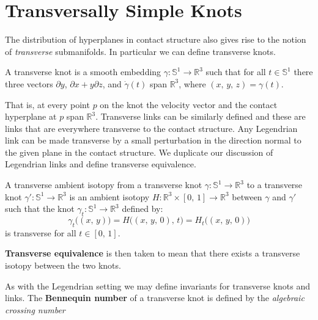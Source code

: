 \section{Transversally Simple Knots}
    The distribution of hyperplanes in contact structure also gives rise to
    the notion of \textit{transverse} submanifolds. In particular we can define
    transverse knots.
    \begin{definition}
        A transverse knot is a smooth embedding
        $\gamma:\mathbb{S}^{1}\rightarrow\mathbb{R}^{3}$ such that for all
        $t\in\mathbb{S}^{1}$ there three vectors
        $\partial{y}$, $\partial{x}+y\partial{z}$, and
        $\dot{\gamma}(t)$ span $\mathbb{R}^{3}$, where $(x,\,y,\,z)=\gamma(t)$.
    \end{definition}
    That is, at every point $p$ on the knot the velocity vector and the contact
    hyperplane at $p$ span $\mathbb{R}^{3}$. Transverse links can be similarly
    defined and these are links that are everywhere transverse to the contact
    structure. Any Legendrian link can be made transverse by a small
    perturbation in the direction normal to the given plane in the contact
    structure. We duplicate our discussion of Legendrian links and define
    transverse equivalence.
    \begin{definition}
        A transverse ambient isotopy from a transverse knot
        $\gamma:\mathbb{S}^{1}\rightarrow\mathbb{R}^{3}$ to a transverse knot
        $\gamma':\mathbb{S}^{1}\rightarrow\mathbb{R}^{3}$ is an ambient
        isotopy $H:\mathbb{R}^{3}\times[0,\,1]\rightarrow\mathbb{R}^{3}$
        between $\gamma$ and $\gamma'$ such that the knot
        $\gamma_{t}:\mathbb{S}^{1}\rightarrow\mathbb{R}^{3}$ defined by:
        \begin{equation}
            \gamma_{t}\big((x,\,y)\big)
            =H\big((x,\,y,\,0),\,t\big)
            =H_{t}\big((x,\,y,\,0)\big)
        \end{equation}
        is transverse for all $t\in[0,\,1]$.
    \end{definition}
    \textbf{Transverse equivalence} is then taken to mean that there exists
    a transverse isotopy between the two knots.
    \par\hfill\par
    As with the Legendrian setting we may define invariants for transverse
    knots and links. The \textbf{Bennequin number} of a
    transverse knot is defined by the \textit{algebraic crossing number}
